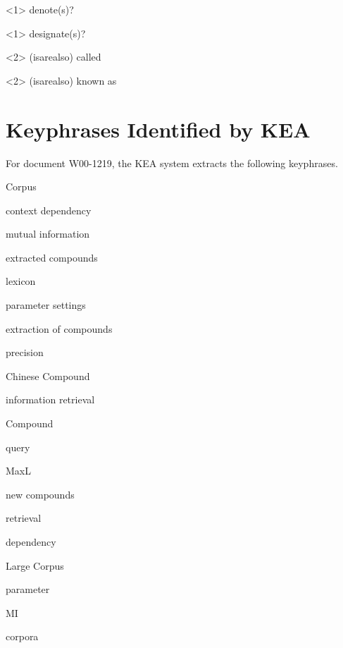 \documentclass[hyp]{socreport}
\begin{document}
\textless{}1\textgreater{}  denote(s)? 

\textless{}1\textgreater{}  designate(s)? 

\textless{}2\textgreater{}  (is\textvert{}are\textvert{}also) called 

\textless{}2\textgreater{}  (is\textvert{}are\textvert{}also) known as 

\section{Keyphrases Identified by KEA}
For document W00-1219, the KEA system extracts the following keyphrases.
 
Corpus

context dependency

mutual information

extracted compounds

lexicon

parameter settings

extraction of compounds

precision

Chinese Compound

information retrieval

Compound

query

MaxL

new compounds

retrieval

dependency

Large Corpus

parameter

MI

corpora
\end{document}
